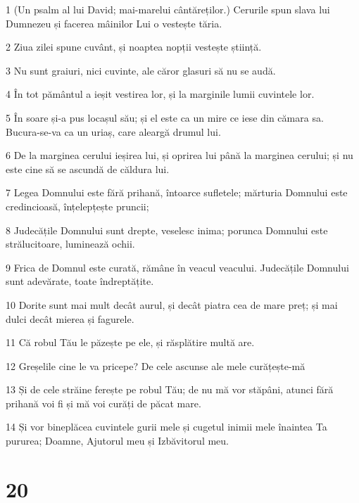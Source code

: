 \par 1 (Un psalm al lui David; mai-marelui cântăreților.) Cerurile spun slava lui Dumnezeu și facerea mâinilor Lui o vestește tăria.
\par 2 Ziua zilei spune cuvânt, și noaptea nopții vestește știință.
\par 3 Nu sunt graiuri, nici cuvinte, ale căror glasuri să nu se audă.
\par 4 În tot pământul a ieșit vestirea lor, și la marginile lumii cuvintele lor.
\par 5 În soare și-a pus locașul său; și el este ca un mire ce iese din cămara sa. Bucura-se-va ca un uriaș, care aleargă drumul lui.
\par 6 De la marginea cerului ieșirea lui, și oprirea lui până la marginea cerului; și nu este cine să se ascundă de căldura lui.
\par 7 Legea Domnului este fără prihană, întoarce sufletele; mărturia Domnului este credincioasă, înțelepțește pruncii;
\par 8 Judecățile Domnului sunt drepte, veselesc inima; porunca Domnului este strălucitoare, luminează ochii.
\par 9 Frica de Domnul este curată, rămâne în veacul veacului. Judecățile Domnului sunt adevărate, toate îndreptățite.
\par 10 Dorite sunt mai mult decât aurul, și decât piatra cea de mare preț; și mai dulci decât mierea și fagurele.
\par 11 Că robul Tău le păzește pe ele, și răsplătire multă are.
\par 12 Greșelile cine le va pricepe? De cele ascunse ale mele curățește-mă
\par 13 Și de cele străine ferește pe robul Tău; de nu mă vor stăpâni, atunci fără prihană voi fi și mă voi curăți de păcat mare.
\par 14 Și vor bineplăcea cuvintele gurii mele și cugetul inimii mele înaintea Ta pururea; Doamne, Ajutorul meu și Izbăvitorul meu.

\chapter{20}

